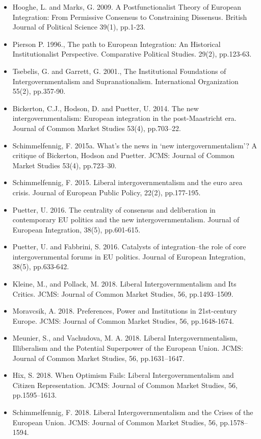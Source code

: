 \begin{itemize}
	\item Hooghe, L. and Marks, G. 2009. A Postfunctionalist Theory of European Integration: From Permissive Consensus to Constraining Dissensus. British Journal of Political Science 39(1), pp.1-23.
	\item Pierson P. 1996., The path to European Integration: An Historical Institutionalist Perspective. Comparative Political Studies. 29(2), pp.123-63.
	\item Tsebelis, G. and Garrett, G. 2001., The Institutional Foundations of Intergovernmentalism and Supranationalism. International Organization 55(2), pp.357-90.
	\item Bickerton, C.J., Hodson, D. and Puetter, U. 2014. The new intergovernmentalism: European integration in the post-Maastricht era. Journal of Common Market Studies 53(4), pp.703–22.
	\item Schimmelfennig, F. 2015a. What’s the news in `new intergovernmentalism'? A critique of Bickerton, Hodson and Puetter. JCMS: Journal of Common Market Studies 53(4), pp.723–30.
	\item Schimmelfennig, F. 2015. Liberal intergovernmentalism and the euro area crisis. Journal of European Public Policy, 22(2), pp.177-195.
	\item Puetter, U. 2016. The centrality of consensus and deliberation in contemporary EU politics and the new intergovernmentalism. Journal of European Integration, 38(5), pp.601-615.
	\item Puetter, U. and Fabbrini, S. 2016. Catalysts of integration–the role of core intergovernmental forums in EU politics. Journal of European Integration, 38(5), pp.633-642.
	\item Kleine, M., and Pollack, M. 2018. Liberal Intergovernmentalism and Its Critics. JCMS: Journal of Common Market Studies, 56, pp.1493–1509.
	\item Moravcsik, A. 2018. Preferences, Power and Institutions in 21st-century Europe. JCMS: Journal of Common Market Studies, 56, pp.1648-1674.
	\item Meunier, S., and Vachudova, M. A. 2018. Liberal Intergovernmentalism, Illiberalism and the Potential Superpower of the European Union. JCMS: Journal of Common Market Studies, 56, pp.1631–1647.
	\item Hix, S. 2018. When Optimism Fails: Liberal Intergovernmentalism and Citizen Representation. JCMS: Journal of Common Market Studies, 56, pp.1595–1613.
	\item Schimmelfennig, F. 2018. Liberal Intergovernmentalism and the Crises of the European Union. JCMS: Journal of Common Market Studies, 56, pp.1578–1594.

\end{itemize}
